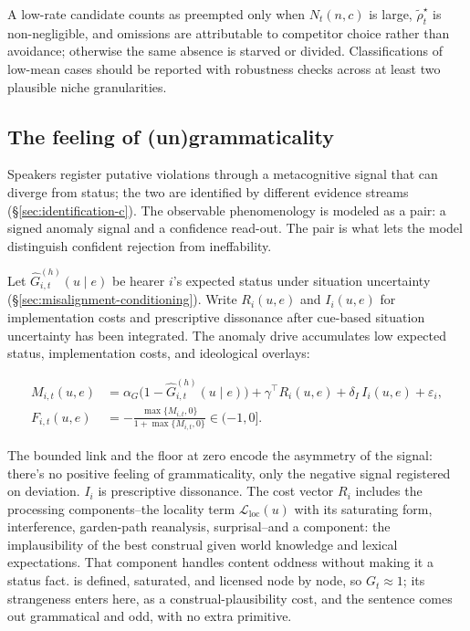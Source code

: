 A low-rate candidate counts as preempted only when $N_t(n,c)$ is large,
$\widetilde{\rho}_t^\star$ is non-negligible, and omissions are attributable to competitor
choice rather than avoidance; otherwise the same absence is starved or divided.
Classifications of low-mean cases should be reported with robustness checks
across at least two plausible niche granularities.

\subsection{The feeling of (un)grammaticality}
\label{sec:feeling-new}

Speakers register putative violations through a metacognitive signal that can diverge from status; the two are identified by different evidence streams (\S\ref{sec:identification-c}). The observable phenomenology is modeled as a pair: a signed anomaly signal and a confidence read-out. The pair is what lets the model distinguish confident rejection from ineffability.

Let $\hat{G}^{(h)}_{i,t}(u\mid e)$ be hearer $i$'s expected status under
situation uncertainty (\S\ref{sec:misalignment-conditioning}). Write
$R_i(u,e)$ and $I_i(u,e)$ for implementation costs and prescriptive dissonance
after cue-based situation uncertainty has been integrated. The anomaly drive
accumulates low expected status, implementation costs, and ideological overlays:

\begin{align}
M_{i,t}(u,e) &= \alpha_G\bigl(1-\hat{G}^{(h)}_{i,t}(u\mid e)\bigr)
  +\gamma^{\top} R_i(u,e)+\delta_I\,I_i(u,e)+\varepsilon_i, \\
F_{i,t}(u,e) &= -\frac{\max\{M_{i,t},0\}}{1+\max\{M_{i,t},0\}}
  \in (-1,0].
\end{align}

The bounded link and the floor at zero encode the asymmetry of the signal:
there's no positive feeling of grammaticality, only the negative signal
registered on deviation. $I_i$ is prescriptive dissonance. The cost vector
$R_i$ includes the processing components--the locality term
$\mathcal{L}_{\mathrm{loc}}(u)$ with its saturating form, interference,
garden-path reanalysis, surprisal--and a
 component: the implausibility of the best construal given
world knowledge and lexical expectations. That component handles content
oddness without making it a status fact.  is defined, saturated, and licensed node by node, so $G_t\approx1$;
its strangeness enters here, as a construal-plausibility cost, and the sentence
comes out grammatical and odd, with no extra primitive.

